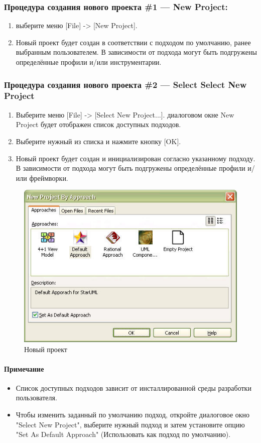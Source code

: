 \documentclass[a4paper,12pt]{report}
\begin{document}
\subsubsection*{Процедура создания нового проекта \#1 --- New Project:}
\begin{enumerate}
	\item выберите меню [File] -> [New Project].
	\item Новый проект будет создан в соответствии с подходом по умолчанию, ранее выбранным
	пользователем. В зависимости от подхода могут быть подгружены определённые профили
	и/или инструментарии.
\end{enumerate}
 
\subsubsection*{Процедура создания нового проекта \#2 --- Select Select New Project}
\begin{enumerate}
	\item Выберите меню [File] -> [Select New Project...].
	диалоговом окне New Project будет отображен список доступных подходов.
	\item Выберите	нужный из списка и нажмите кнопку [OK].
	\item Новый проект будет создан и инициализирован согласно указанному подходу. В
	зависимости от подхода могут быть подгружены определённые профили и/или фреймворки.
\end{enumerate}
\begin{figure}[h!]
	\centering
	\includegraphics[width=0.7\linewidth]{images/newproject}
	\caption{Новый проект}
	\label{fig:newproject}
\end{figure}

\paragraph{Примечание}
\begin{itemize}
	\item Список доступных подходов зависит от инсталлированной среды разработки пользователя.
	\item Чтобы изменить заданный по умолчанию подход, откройте диалоговое окно "Select New
	Project", выберите нужный подход и затем установите опцию "Set As Default Approach"
	(Использовать как подход по умолчанию).
\end{itemize}
\end{document}
